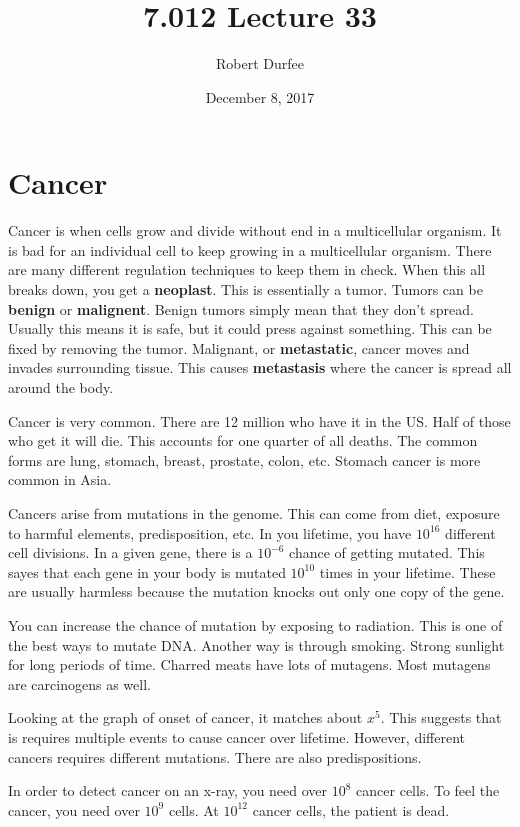 \documentclass{article}
\title{ 7.012 Lecture 33 }
\author{ Robert Durfee }
\date{ December 8, 2017 }
\begin{document}
\maketitle

\section{ Cancer }

Cancer is when cells grow and divide without end in a multicellular organism. It
is bad for an individual cell to keep growing in a multicellular organism. There
are many different regulation techniques to keep them in check. When this all
breaks down, you get a \textbf{neoplast}. This is essentially a tumor. Tumors
can be \textbf{benign} or \textbf{malignent}. Benign tumors simply mean that
they don't spread. Usually this means it is safe, but it could press against
something. This can be fixed by removing the tumor. Malignant, or
\textbf{metastatic}, cancer moves and invades surrounding tissue.  This causes
\textbf{metastasis} where the cancer is spread all around the body.

Cancer is very common. There are 12 million who have it in the US. Half of those
who get it will die. This accounts for one quarter of all deaths. The common
forms are lung, stomach, breast, prostate, colon, etc. Stomach cancer is more
common in Asia. 

Cancers arise from mutations in the genome. This can come from diet, exposure to
harmful elements, predisposition, etc. In you lifetime, you have $10^{16}$
different cell divisions. In a given gene, there is a $10^{-6}$ chance of
getting mutated. This sayes that each gene in your body is mutated $10^{10}$
times in your lifetime. These are usually harmless because the mutation knocks
out only one copy of the gene. 

You can increase the chance of mutation by exposing to radiation. This is one of
the best ways to mutate DNA. Another way is through smoking. Strong sunlight for
long periods of time. Charred meats have lots of mutagens. Most mutagens are
carcinogens as well. 

Looking at the graph of onset of cancer, it matches about $x^{5}$. This suggests
that is requires multiple events to cause cancer over lifetime. However,
different cancers requires different mutations. There are also predispositions. 

In order to detect cancer on an x-ray, you need over $10^{8}$ cancer cells. To
feel the cancer, you need over $10^{9}$ cells. At $10^{12}$ cancer cells, the
patient is dead. 
\end{document}
